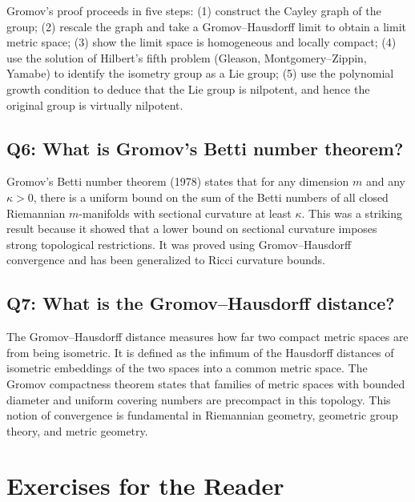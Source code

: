Gromov's proof proceeds in five steps: (1) construct the Cayley graph of the group; (2) rescale the graph and take a Gromov--Hausdorff limit to obtain a limit metric space; (3) show the limit space is homogeneous and locally compact; (4) use the solution of Hilbert's fifth problem (Gleason, Montgomery--Zippin, Yamabe) to identify the isometry group as a Lie group; (5) use the polynomial growth condition to deduce that the Lie group is nilpotent, and hence the original group is virtually nilpotent.

\subsection*{Q6: What is Gromov's Betti number theorem?}

Gromov's Betti number theorem (1978) states that for any dimension \(m\) and any \(\kappa > 0\), there is a uniform bound on the sum of the Betti numbers of all closed Riemannian \(m\)-manifolds with sectional curvature at least \(\kappa\). This was a striking result because it showed that a lower bound on sectional curvature imposes strong topological restrictions. It was proved using Gromov--Hausdorff convergence and has been generalized to Ricci curvature bounds.

\subsection*{Q7: What is the Gromov--Hausdorff distance?}

The Gromov--Hausdorff distance measures how far two compact metric spaces are from being isometric. It is defined as the infimum of the Hausdorff distances of isometric embeddings of the two spaces into a common metric space. The Gromov compactness theorem states that families of metric spaces with bounded diameter and uniform covering numbers are precompact in this topology. This notion of convergence is fundamental in Riemannian geometry, geometric group theory, and metric geometry.

\section*{Exercises for the Reader}

